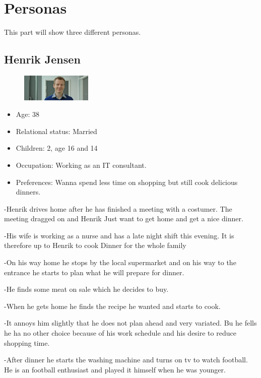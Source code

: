 \section{Personas}
This part will show three different personas.

\subsection{Henrik Jensen}
\begin{figure}[H]
	\includegraphics[width=0.30\textwidth]{Grafik/FoodPlanner/PersonaHenrikJensen}
	\label{PersonaHenrikJensen}
\end{figure}
\begin{itemize}
	\item Age: 38
	\item Relational status: Married
	\item Children: 2, age 16 and 14
	\item Occupation: Working as an IT consultant.
	\item Preferences: Wanna spend less time on shopping but still cook delicious dinners.
\end{itemize}
-Henrik drives home after he has finished a meeting with a costumer. The meeting dragged on and Henrik Just want to get home and get a nice dinner.

-His wife is working as a nurse and has a late night shift this evening. It is therefore up to Henrik to cook Dinner for the whole family

-On his way home he stops by the local supermarket and on his way to the entrance he starts to plan what he will prepare for dinner.

-He finds some meat on sale which he decides to buy.

-When he gets home he finds the recipe he wanted and starts to cook.

-It annoys him slightly that he does not plan ahead and very variated. Bu he fells he ha no other choice because of his work schedule and his desire to reduce shopping time.

-After dinner he starts the washing machine and turns on tv to watch football. He is an football enthusiast and played it himself when he was younger. 

